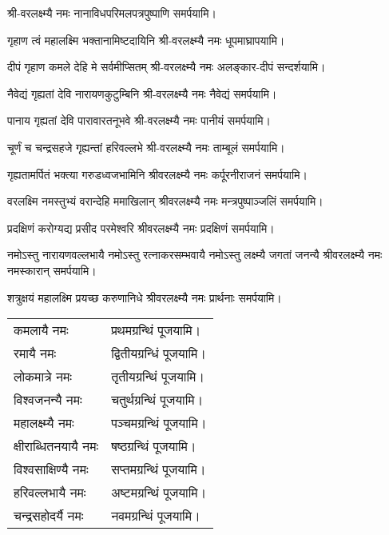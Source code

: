 \begingroup
\centering
\setlength{\columnseprule}{1pt}
\let\chapt\sect


\endgroup

श्री-वरलक्ष्म्यै नमः नानाविध\-परिमल\-पत्रपुष्पाणि समर्पयामि।

\begin{center}
{गृहाण त्वं महालक्ष्मि भक्तानामिष्टदायिनि}
श्री-वरलक्ष्म्यै नमः धूपमाघ्रापयामि।\medskip

{दीपं गृहाण कमले देहि मे सर्वमीप्सितम्}
श्री-वरलक्ष्म्यै नमः अलङ्कार-दीपं सन्दर्शयामि। \medskip

{नैवेद्यं गृह्यतां देवि नारायणकुटुम्बिनि} 
श्री-वरलक्ष्म्यै नमः नैवेद्यं समर्पयामि। \medskip

{पानाय गृह्यतां देवि पारावारतनूभवे} 
श्री-वरलक्ष्म्यै नमः पानीयं समर्पयामि। \medskip


{चूर्णं च चन्द्रसहजे गृह्यन्तां हरिवल्लभे}
श्री-वरलक्ष्म्यै नमः ताम्बूलं समर्पयामि। \medskip


{गृह्यतामर्पितं भक्त्या गरुडध्वजभामिनि}
श्रीवरलक्ष्म्यै नमः कर्पूरनीराजनं समर्पयामि।\medskip

{वरलक्ष्मि नमस्तुभ्यं वरान्देहि ममाखिलान्}
श्रीवरलक्ष्म्यै नमः मन्त्रपुष्पाञ्जलिं समर्पयामि।\medskip

{प्रदक्षिणं करोग्यद्य प्रसीद परमेश्वरि}
श्रीवरलक्ष्म्यै नमः प्रदक्षिणं समर्पयामि।\medskip

{नमोऽस्तु नारायणवल्लभायै }
{नमोऽस्तु रत्नाकरसम्भवायै} 
{नमोऽस्तु लक्ष्म्यै जगतां जनन्यै} 
श्रीवरलक्ष्म्यै नमः नमस्कारान् समर्पयामि।\medskip

{शत्रुक्षयं महालक्ष्मि प्रयच्छ करुणानिधे}
श्रीवरलक्ष्म्यै नमः प्रार्थनाः समर्पयामि।\medskip


\begin{longtable}{l@{— }l}
कमलायै नमः & प्रथमग्रन्थिं पूजयामि।\\
रमायै नमः & द्वितीयग्रन्धिं पूजयामि।\\
लोकमात्रे नमः & तृतीयग्रन्थिं पूजयामि।\\
विश्वजनन्यै नमः & चतुर्थग्रन्थिं पूजयामि।\\
महालक्ष्म्यै नमः & पञ्चमग्रन्थिं पूजयामि।\\
क्षीराब्धितनयायै नमः & षष्ठग्रन्थिं पूजयामि।\\
विश्वसाक्षिण्यै नमः & सप्तमग्रन्थिं पूजयामि।\\
हरिवल्लभायै नमः & अष्टमग्रन्थिं पूजयामि।\\
चन्द्रसहोदर्यै नमः & नवमग्रन्थिं पूजयामि।\\
\end{longtable}


\end{center}
